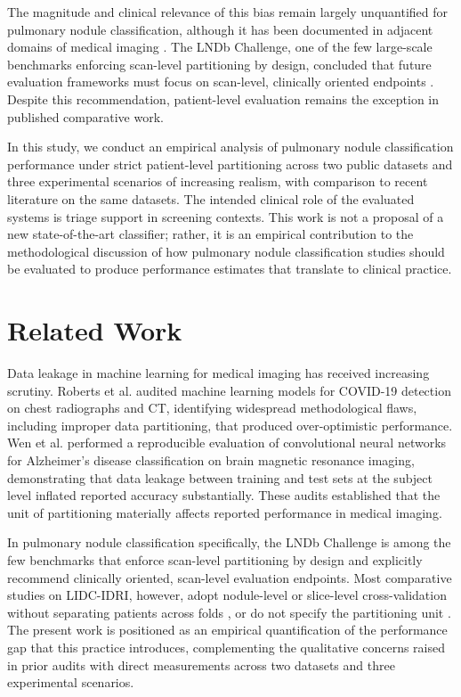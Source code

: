 \documentclass{ieeeaccess}
\begin{document}
The magnitude and clinical relevance of this bias remain largely unquantified for pulmonary nodule classification, although it has been documented in adjacent domains of medical imaging \cite{roberts2021,wen2020}. The LNDb Challenge, one of the few large-scale benchmarks enforcing scan-level partitioning by design, concluded that future evaluation frameworks must focus on scan-level, clinically oriented endpoints \cite{pedrosa2021}. Despite this recommendation, patient-level evaluation remains the exception in published comparative work.

In this study, we conduct an empirical analysis of pulmonary nodule classification performance under strict patient-level partitioning across two public datasets and three experimental scenarios of increasing realism, with comparison to recent literature on the same datasets. The intended clinical role of the evaluated systems is triage support in screening contexts. This work is not a proposal of a new state-of-the-art classifier; rather, it is an empirical contribution to the methodological discussion of how pulmonary nodule classification studies should be evaluated to produce performance estimates that translate to clinical practice.

\section{Related Work}
\label{sec:related}
Data leakage in machine learning for medical imaging has received increasing scrutiny. Roberts et al. \cite{roberts2021} audited machine learning models for COVID-19 detection on chest radiographs and CT, identifying widespread methodological flaws, including improper data partitioning, that produced over-optimistic performance. Wen et al. \cite{wen2020} performed a reproducible evaluation of convolutional neural networks for Alzheimer's disease classification on brain magnetic resonance imaging, demonstrating that data leakage between training and test sets at the subject level inflated reported accuracy substantially. These audits established that the unit of partitioning materially affects reported performance in medical imaging.

In pulmonary nodule classification specifically, the LNDb Challenge \cite{pedrosa2021} is among the few benchmarks that enforce scan-level partitioning by design and explicitly recommend clinically oriented, scan-level evaluation endpoints. Most comparative studies on LIDC-IDRI, however, adopt nodule-level or slice-level cross-validation without separating patients across folds \cite{xu2020,alshabi2019}, or do not specify the partitioning unit \cite{xiao2020,mahbod2023,zhang2024}. The present work is positioned as an empirical quantification of the performance gap that this practice introduces, complementing the qualitative concerns raised in prior audits with direct measurements across two datasets and three experimental scenarios.
\end{document}
